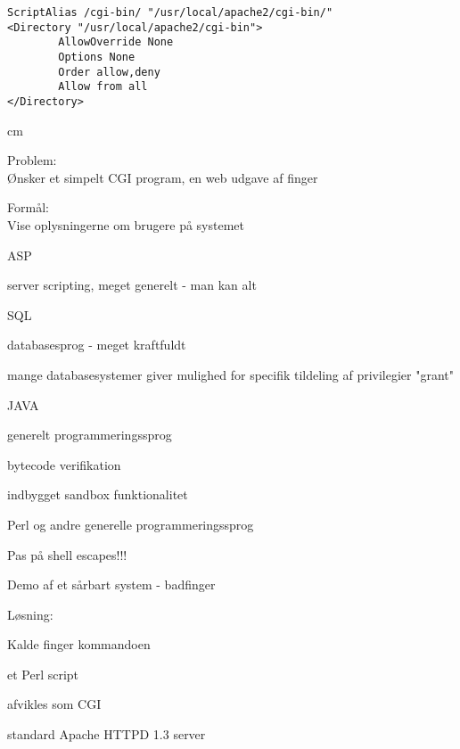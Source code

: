 \begin{verbatim}
ScriptAlias /cgi-bin/ "/usr/local/apache2/cgi-bin/"
<Directory "/usr/local/apache2/cgi-bin">
        AllowOverride None
        Options None
        Order allow,deny
        Allow from all
</Directory>
\end{verbatim}


 cm

\begin{list1}
\item Problem:\\
Ønsker et simpelt CGI program, en web udgave af finger
\item Formål:\\
Vise oplysningerne om brugere på systemet
\end{list1}


\begin{list1}
\item ASP
\begin{list2}
\item server scripting, meget generelt - man kan alt
\end{list2}

\item SQL
\begin{list2}
\item databasesprog - meget kraftfuldt
\item mange databasesystemer giver mulighed for specifik tildeling af
  privilegier "grant" 
  \end{list2}
\item JAVA
\begin{list2}
\item generelt programmeringssprog
\item bytecode verifikation
\item indbygget sandbox funktionalitet 
\end{list2}
\item Perl og andre generelle programmeringssprog
\item Pas på shell escapes!!!
\end{list1}


\begin{list1}
\item Demo af et sårbart system - badfinger
\item Løsning:
\begin{list2}
\item Kalde finger kommandoen
\item et Perl script
\item afvikles som CGI 
\item standard Apache HTTPD 1.3 server
\end{list2}
\end{list1}

